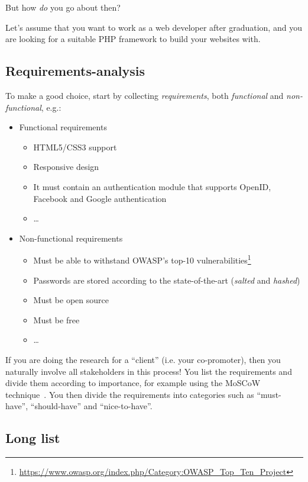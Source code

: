 But how \emph{do} you go about then?

Let's assume that you want to work as a web developer after graduation, and you are looking for a suitable PHP framework to build your websites with.

\subsection{Requirements-analysis}
\label{ssec:requirements-analysis}

To make a good choice, start by collecting \emph{requirements}, both \textit{functional} and \emph{non-functional}, e.g.:

\begin{itemize}
\item Functional requirements
  \begin{itemize}
 \item HTML5/CSS3 support
 \item Responsive design
 \item It must contain an authentication module that supports OpenID, Facebook and Google authentication
  \item \ldots
  \end{itemize}
\item Non-functional requirements
  \begin{itemize}
 \item Must be able to withstand OWASP's top-10 vulnerabilities\footnote{\url{https://www.owasp.org/index.php/Category:OWASP_Top_Ten_Project}}
 \item Passwords are stored according to the state-of-the-art (\emph{salted} and \emph{hashed})
 \item Must be open source
 \item Must be free
  \item \ldots
  \end{itemize}
\end{itemize}

If you are doing the research for a ``client'' (i.e. your co-promoter), then you naturally involve all stakeholders in this process! You list the requirements and divide them according to importance, for example using the MoSCoW technique~\parencite{Nordenstam2014}. You then divide the requirements into categories such as ``must-have'', ``should-have'' and ``nice-to-have''.

\subsection{Long list}
\label{ssec:long-list}

